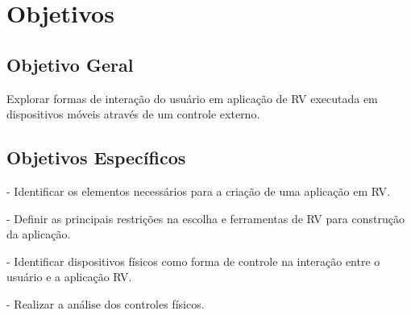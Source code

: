 \chapter{Objetivos}
\label{c.objetivos}

\section{Objetivo Geral}
\label{s.geral}
Explorar formas de interação do usuário em aplicação de RV executada em dispositivos móveis através de um controle externo.

\section{Objetivos Específicos}
\label{s.especifico}
- Identificar os elementos necessários para a criação de uma aplicação em RV.

- Definir as principais restrições na escolha e ferramentas de RV para construção da aplicação.

- Identificar dispositivos físicos como forma de controle na interação entre o usuário e a aplicação RV.

- Realizar a análise dos controles físicos.




